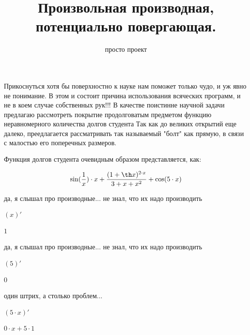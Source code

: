 \documentclass[a4paper,12pt]{article}
\title{Произвольная производная, потенциально повергающая.}
\author{просто проект}
\begin{document}
\maketitle

Прикоснуться хотя бы поверхностно к науке нам поможет только чудо, и уж явно не понимание.
В этом и состоит причина использования всяческих программ, и не в коем случае собственных рук!!!
В качестве поистинне научной задачи предлагаю рассмотреть покрытие продолговатым предметом функцию неравномерного количества долгов студента
Так как до великих открытий еще далеко, преедлагается рассматривать так называемый "болт" как прямую, в связи с малостью его поперечных размеров.

Функция долгов студента очевидным образом представляется, как:

\begin{equation} \sin ( \frac{1}{x} ) \cdot x+ \frac{(1+ \th x)^{2 \cdot x}}{3+x+x^{2}} + \cos (5 \cdot x)\end{equation}

да, я слышал про производные... не знал, что их надо производить 

\begin{center}$(x)'$

\end{center}



\begin{center}$1$

\end{center}

да, я слышал про производные... не знал, что их надо производить 

\begin{center}$(5)'$

\end{center}



\begin{center}$0$

\end{center}

один штрих, а столько проблем... 

\begin{center}$(5 \cdot x)'$

\end{center}



\begin{center}$0 \cdot x+5 \cdot 1$

\end{center}
\end{document}
